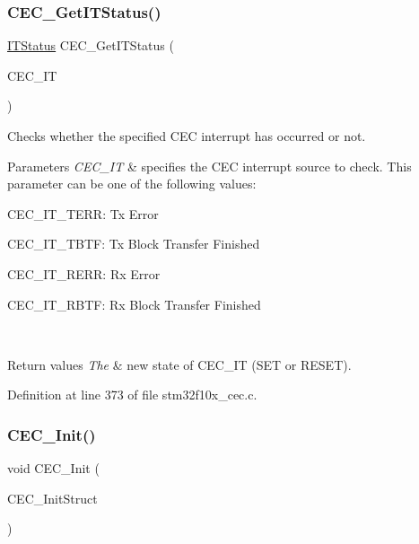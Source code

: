 \subsubsection{\texorpdfstring{C\+E\+C\+\_\+\+Get\+I\+T\+Status()}{CEC\_GetITStatus()}}
{\footnotesize\ttfamily \hyperlink{group___exported__types_gaacbd7ed539db0aacd973a0f6eca34074}{I\+T\+Status} C\+E\+C\+\_\+\+Get\+I\+T\+Status (\begin{DoxyParamCaption}\item[{uint8\+\_\+t}]{C\+E\+C\+\_\+\+IT }\end{DoxyParamCaption})}



Checks whether the specified C\+EC interrupt has occurred or not. 


\begin{DoxyParams}{Parameters}
{\em C\+E\+C\+\_\+\+IT} & specifies the C\+EC interrupt source to check. This parameter can be one of the following values\+: \begin{DoxyItemize}
\item C\+E\+C\+\_\+\+I\+T\+\_\+\+T\+E\+RR\+: Tx Error \item C\+E\+C\+\_\+\+I\+T\+\_\+\+T\+B\+TF\+: Tx Block Transfer Finished \item C\+E\+C\+\_\+\+I\+T\+\_\+\+R\+E\+RR\+: Rx Error \item C\+E\+C\+\_\+\+I\+T\+\_\+\+R\+B\+TF\+: Rx Block Transfer Finished \end{DoxyItemize}
\\
\hline
\end{DoxyParams}

\begin{DoxyRetVals}{Return values}
{\em The} & new state of C\+E\+C\+\_\+\+IT (S\+ET or R\+E\+S\+ET). \\
\hline
\end{DoxyRetVals}


Definition at line 373 of file stm32f10x\+\_\+cec.\+c.

\mbox{\label{group___c_e_c___private___functions_gaf48aee745a16370372b3eaa7cf3ed22b}} 
\subsubsection{\texorpdfstring{C\+E\+C\+\_\+\+Init()}{CEC\_Init()}}
{\footnotesize\ttfamily void C\+E\+C\+\_\+\+Init (\begin{DoxyParamCaption}\item[{\hyperlink{struct_c_e_c___init_type_def}{C\+E\+C\+\_\+\+Init\+Type\+Def} $\ast$}]{C\+E\+C\+\_\+\+Init\+Struct }\end{DoxyParamCaption})}



